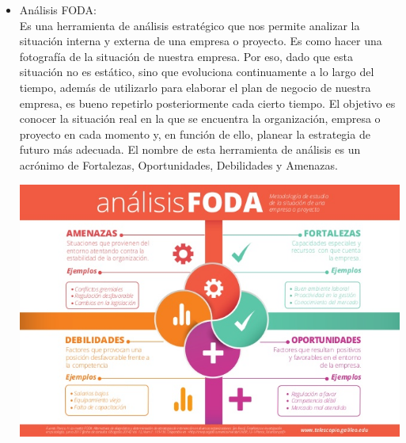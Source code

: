 \begin{itemize}
\item Análisis FODA:
\\Es una herramienta de análisis estratégico que nos permite analizar la situación interna y externa de una empresa o proyecto. Es como hacer una fotografía de la situación de nuestra empresa. Por eso, dado que esta situación no es estático, sino que evoluciona continuamente a lo largo del tiempo, además de utilizarlo para elaborar el plan de negocio de nuestra empresa, es bueno repetirlo posteriormente cada cierto tiempo. El objetivo es conocer la situación real en la que se encuentra la organización, empresa o proyecto en cada momento y, en función de ello, planear la estrategia de futuro más adecuada. El nombre de esta herramienta de análisis es un acrónimo de Fortalezas, Oportunidades, Debilidades y Amenazas. 
		\begin{center}
		\includegraphics[width=15cm]{./Imagenes/Imagen3}
		\end{center}

	\end{itemize} 
	
